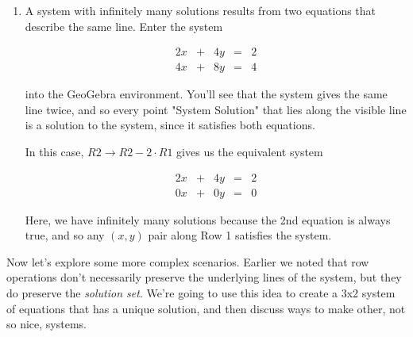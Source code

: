 \documentclass{ximera}
\begin{document}
\begin{exploration}
\begin{example}
\begin{solution}
\begin{enumerate}
                \item A system with infinitely many solutions results from two equations that describe the same line. Enter the system
    
                    $$\begin{array}{ccccc}
                            2x & +&4y&=&2 \\
                            4x& +&8y&=&4
                        \end{array}$$
    
                    into the GeoGebra environment. You'll see that the system gives the same line twice, and so every point "System Solution" that lies along the visible line is a solution to the system, since it satisfies both equations.
    
                    In this case, $R2\rightarrow R2-2\cdot R1$ gives us the equivalent system
    
                    $$\begin{array}{ccccc}
                            2x & +&4y&=&2 \\
                            0x& +&0y&=&0
                        \end{array}$$
    
                    Here, we have infinitely many solutions because the 2nd equation is always true, and so any $(x,y)$ pair along Row 1 satisfies the system.
    
            \end{enumerate}
               
    
        \end{solution}
    
    \end{example}
    
    Now let's explore some more complex scenarios. Earlier we noted that row operations don't necessarily preserve the underlying lines of the system, but they do preserve the \emph{solution set}. We're going to use this idea to create a 3x2 system of equations that has a unique solution, and then discuss ways to make other, not so nice, systems.
    
    
    
    
    

\end{exploration}
\end{document}
